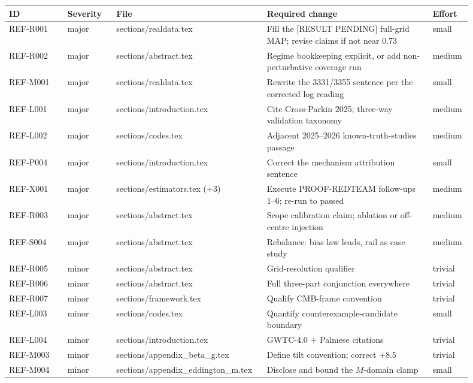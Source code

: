 \documentclass[11pt]{article}
\begin{document}
\begin{longtable}{@{}p{0.12\linewidth}p{0.10\linewidth}p{0.26\linewidth}>{\raggedright\arraybackslash}p{0.34\linewidth}p{0.08\linewidth}@{}}
\toprule
\textbf{ID} & \textbf{Severity} & \textbf{File} & \textbf{Required change} & \textbf{Effort} \\
\midrule
\endhead
REF-R001 & major & sections/realdata.tex & Fill the [RESULT PENDING] full-grid MAP; revise claims if not near 0.73 & small \\
REF-R002 & major & sections/abstract.tex & Regime bookkeeping explicit, or add non-perturbative coverage run & medium \\
REF-M001 & major & sections/realdata.tex & Rewrite the 3331/3355 sentence per the corrected log reading & small \\
REF-L001 & major & sections/introduction.tex & Cite Cross-Parkin 2025; three-way validation taxonomy & medium \\
REF-L002 & major & sections/codes.tex & Adjacent 2025--2026 known-truth-studies passage & medium \\
REF-P004 & major & sections/introduction.tex & Correct the mechanism attribution sentence & small \\
REF-X001 & major & sections/estimators.tex (+3) & Execute PROOF-REDTEAM follow-ups 1--6; re-run to passed & medium \\
REF-R003 & major & sections/abstract.tex & Scope calibration claim; ablation or off-centre injection & medium \\
REF-S004 & major & sections/abstract.tex & Rebalance: bias law leads, rail as case study & medium \\
REF-R005 & minor & sections/abstract.tex & Grid-resolution qualifier & trivial \\
REF-R006 & minor & sections/abstract.tex & Full three-part conjunction everywhere & trivial \\
REF-R007 & minor & sections/framework.tex & Qualify CMB-frame convention & trivial \\
REF-L003 & minor & sections/codes.tex & Quantify counterexample-candidate boundary & small \\
REF-L004 & minor & sections/introduction.tex & GWTC-4.0 + Palmese citations & trivial \\
REF-M003 & minor & sections/appendix\_beta\_g.tex & Define tilt convention; correct $+8.5$ & trivial \\
REF-M004 & minor & sections/appendix\_eddington\_m.tex & Disclose and bound the $M$-domain clamp & small \\

\end{longtable}
\end{document}
